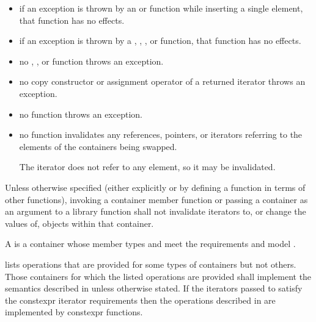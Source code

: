 \begin{itemize}
\item
if an exception is thrown by an
 or 
function while inserting a single element, that
function has no effects.
\item
if an exception is thrown by a
,
,
, or 
function, that function has no effects.
\item
no
,
,
or
function throws an exception.
\item
no copy constructor or assignment operator of a returned iterator
throws an exception.
\item
no
function throws an exception.
\item
no
function invalidates any references,
pointers, or iterators referring to the elements
of the containers being swapped. \begin{note} The  iterator does not refer to any element, so it may be invalidated. \end{note}
\end{itemize}

\pnum
Unless otherwise specified (either explicitly or by defining a
function in terms of other functions), invoking a container member
function or passing a container as an argument to a library function
shall not invalidate iterators to, or change the values of, objects
within that container.

\pnum
{}%
A 
is a container
whose member types  and 
meet the
 requirements and
model .

\pnum
{} lists operations that are provided
for some types of containers but not others. Those containers for which the
listed operations are provided shall implement the semantics described in
 unless otherwise stated.
If the iterators passed to 
satisfy the constexpr iterator requirements
then the operations described in 
are implemented by constexpr functions.

